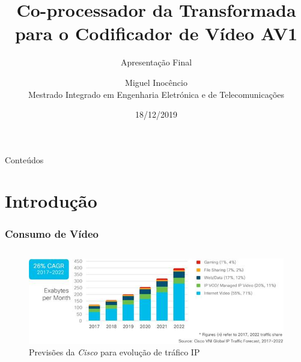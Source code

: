 \documentclass{beamer}
\title[Apresentação Final]{Co-processador da Transformada para o Codificador de Vídeo AV1}
\subtitle{Apresentação Final}
\author[M. Inocêncio]{Miguel Inocêncio\\Mestrado Integrado em Engenharia Eletrónica e de Telecomunicações}
\institute[UA]{Universidade de Aveiro\\ 
              Instituto de Telecomunicações}
\date{18/12/2019}
\begin{document}
\begin{frame}[plain]
	\titlepage
\end{frame}

\begin{frame}{Conteúdos}
	\tableofcontents
\end{frame}


\section{Introdução}

\begin{frame}[c]
	\frametitle{Consumo de Vídeo}
       \begin{columns}
              \column{\textwidth}
                     \begin{figure}[h]
                            \centering
                            \includegraphics[width=\textwidth]{Figures/cisco.jpg}
                            \caption{Previsões da \emph{Cisco} para evolução de tráfico IP}
                            \label{fig:cisco}
                     \end{figure}
       \end{columns}
\end{frame}
\end{document}
